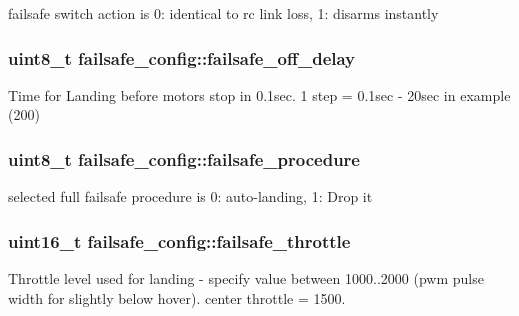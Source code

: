 failsafe switch action is 0\+: identical to rc link loss, 1\+: disarms instantly 

\hypertarget{structfailsafe__config_a9a5a37eebe4d6a20430161f34b63ecac}{
\subsubsection[{failsafe\+\_\+off\+\_\+delay}]{\setlength{\rightskip}{0pt plus 5cm}uint8\+\_\+t failsafe\+\_\+config\+::failsafe\+\_\+off\+\_\+delay}}\label{structfailsafe__config_a9a5a37eebe4d6a20430161f34b63ecac}


Time for Landing before motors stop in 0.\+1sec. 1 step = 0.\+1sec -\/ 20sec in example (200) 

\hypertarget{structfailsafe__config_add85f6d476403111b005ab1e60df1e6d}{
\subsubsection[{failsafe\+\_\+procedure}]{\setlength{\rightskip}{0pt plus 5cm}uint8\+\_\+t failsafe\+\_\+config\+::failsafe\+\_\+procedure}}\label{structfailsafe__config_add85f6d476403111b005ab1e60df1e6d}


selected full failsafe procedure is 0\+: auto-\/landing, 1\+: Drop it 

\hypertarget{structfailsafe__config_a4fab4c40b0b4a56e36b46d32b0a1da14}{
\subsubsection[{failsafe\+\_\+throttle}]{\setlength{\rightskip}{0pt plus 5cm}uint16\+\_\+t failsafe\+\_\+config\+::failsafe\+\_\+throttle}}\label{structfailsafe__config_a4fab4c40b0b4a56e36b46d32b0a1da14}


Throttle level used for landing -\/ specify value between 1000..2000 (pwm pulse width for slightly below hover). center throttle = 1500. 

